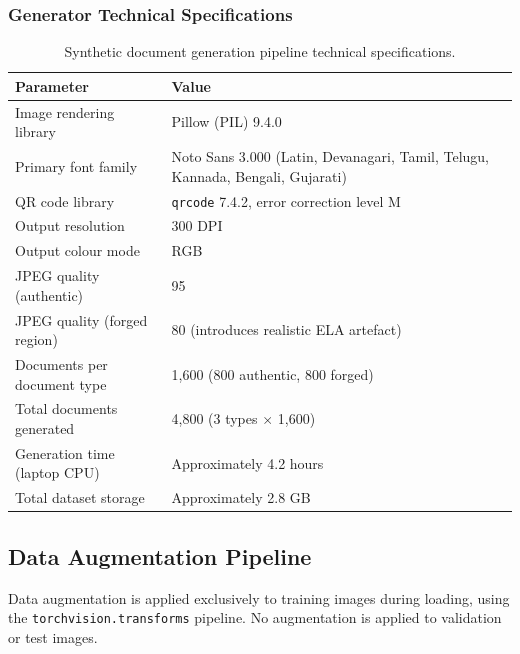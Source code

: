 \documentclass[12pt,a4paper,oneside]{report}
\begin{document}
\subsubsection{Generator Technical Specifications}

\begin{table}[H]
\centering
\caption{Synthetic document generation pipeline technical specifications.}
\label{tab:gen_tech}
\renewcommand{\arraystretch}{1.3}
\begin{tabularx}{\textwidth}{lX}
\toprule
\textbf{Parameter} & \textbf{Value} \\
\midrule
Image rendering library      & Pillow (PIL) 9.4.0 \\
Primary font family          & Noto Sans 3.000 (Latin, Devanagari, Tamil, Telugu, Kannada, Bengali, Gujarati) \\
QR code library              & \texttt{qrcode} 7.4.2, error correction level M \\
Output resolution            & 300 DPI \\
Output colour mode           & RGB \\
JPEG quality (authentic)     & 95 \\
JPEG quality (forged region) & 80 (introduces realistic ELA artefact) \\
Documents per document type  & 1,600 (800 authentic, 800 forged) \\
Total documents generated    & 4,800 (3 types $\times$ 1,600) \\
Generation time (laptop CPU) & Approximately 4.2 hours \\
Total dataset storage        & Approximately 2.8 GB \\
\bottomrule
\end{tabularx}
\end{table}

\subsection{Data Augmentation Pipeline}

Data augmentation is applied exclusively to training images during loading,
using the \texttt{torchvision.transforms} pipeline. No augmentation is applied
to validation or test images.
\end{document}
